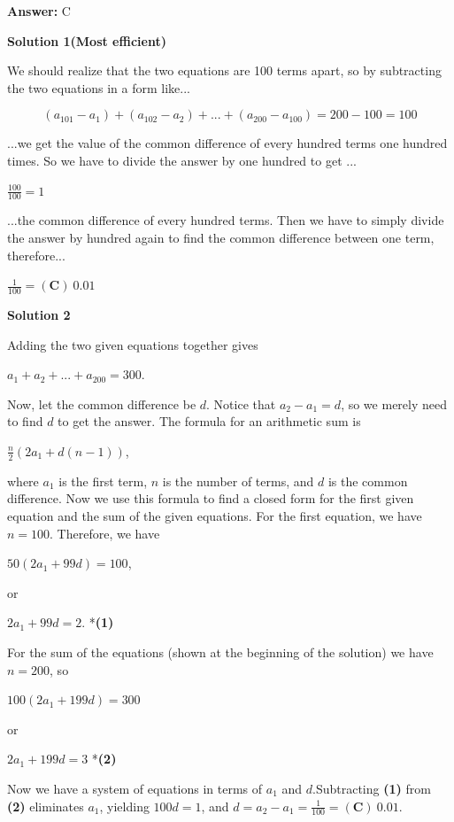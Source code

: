 \begin{enumerate}
 \textbf{Answer: }C



\textbf{Solution 1(Most efficient)}

We should realize that the two equations are 100 terms apart, so by subtracting the two equations in a form like...

 
 \[(a_{101} - a_1) + (a_{102} - a_2) +... + (a_{200} - a_{100}) = 200-100 = 100\]

 ...we get the value of the common difference of every hundred terms one hundred times. So we have to divide the answer by one hundred to get ... 

 $\frac{100}{100} = 1$

 ...the common difference of every hundred terms. Then we have to simply divide the answer by hundred again to find the common difference between one term, therefore...

 $\frac{1}{100} =\boxed{(\textbf{C})\ 0.01}$




\textbf{Solution 2}

Adding the two given equations together gives 

 $a_1+a_2+...+a_{200}=300$.

 Now, let the common difference be $d$. Notice that $a_2-a_1=d$, so we merely need to find $d$ to get the answer. The formula for an arithmetic sum is 

 $\frac{n}{2}\left(2a_1+d(n-1)\right)$,

 where $a_1$ is the first term, $n$ is the number of terms, and $d$ is the common difference. Now we use this formula to find a closed form for the first given equation and the sum of the given equations. For the first equation, we have $n=100$. Therefore, we have 

 $50(2a_1+99d)=100$,

 or 

 $2a_1+99d=2$.          *\textbf{(1)}

 For the sum of the equations (shown at the beginning of the solution) we have $n=200$, so

 $100(2a_1+199d)=300$

 or 

 $2a_1+199d=3$          *\textbf{(2)}

 Now we have a system of equations in terms of $a_1$ and $d$.Subtracting \textbf{(1)} from \textbf{(2)} eliminates $a_1$, yielding $100d=1$, and $d=a_2-a_1=\frac{1}{100}=\boxed{(\textbf{C})\ 0.01}$.

 




\end{enumerate}
